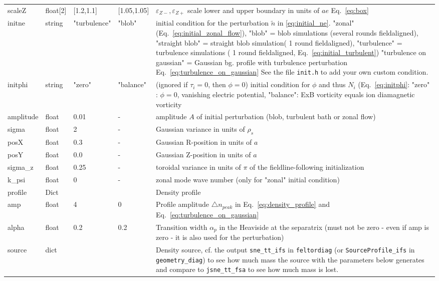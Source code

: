 \begin{longtable}{llllp{6cm}}
    \qquad scaleZ  & float[2] & [1.2,1.1]     & [1.05,1.05] & $\varepsilon_{Z-}, \varepsilon_{Z+}$ scale lower and upper boundary in units of $ae$ Eq.~\eqref{eq:box}
\\
initne    & string & "turbulence"     & "blob"  & initial condition for the
perturbation $\tilde n$ in \eqref{eq:initial_ne}. "zonal" (Eq.~\eqref{eq:initial_zonal_flow}),
    "blob" = blob simulations (several rounds fieldaligned),
    "straight blob" = straight blob simulation( 1 round fieldaligned),
    "turbulence" = turbulence simulations ( 1 round fieldaligned, Eq.~\eqref{eq:initial_turbulent})
    "turbulence on gaussian" = Gaussian bg. profile with turbulence perturbation Eq.~\eqref{eq:turbulence_on_gaussian}
    See the file {\tt init.h} to add your own custom condition.
\\
initphi   & string & "zero"  & "balance" & (ignored if $\tau_i = 0$, then $\phi=0$) initial condition for $\phi$ and thus $N_i$ (Eq.~\eqref{eq:initphi}: "zero" : $\phi = 0$, vanishing
electric potential, "balance": ExB vorticity equals ion diamagnetic vorticity
\\
amplitude  & float &0.01   & - & amplitude $A$ of initial perturbation (blob, turbulent bath or zonal flow)  \\
sigma      & float &2      & - & Gaussian variance in units of $\rho_s$ \\
posX       & float &0.3    & - & Gaussian R-position in units of $a$\\
posY       & float &0.0    & - & Gaussian Z-position in units of $a$ \\
sigma\_z    & float &0.25   & - & toroidal variance in units of $\pi$ of the fieldline-following initialization \\
k\_psi     & float &0    & - & zonal mode wave number (only for "zonal" initial condition)  \\
profile & Dict & & & Density profile \\
\qquad amp& float &4   & 0 & Profile amplitude $\triangle n_{peak}$ in
Eq.~\eqref{eq:density_profile} and Eq.~\eqref{eq:turbulence_on_gaussian}
\\
\qquad alpha  & float & 0.2 & 0.2 & Transition width $\alpha_p$ in the Heaviside
at the separatrix (must not be zero - even if amp is zero - it is also used for the perturbation)
\\
source & dict & & & Density source, cf. the output \texttt{sne\_tt\_ifs} in \texttt{feltordiag} (or \texttt{SourceProfile\_ifs} in \texttt{geometry\_diag}) to see how much mass the source with the parameters below generates and compare to \texttt{jsne\_tt\_fsa} to see how much mass is lost.  \\

\end{longtable}
